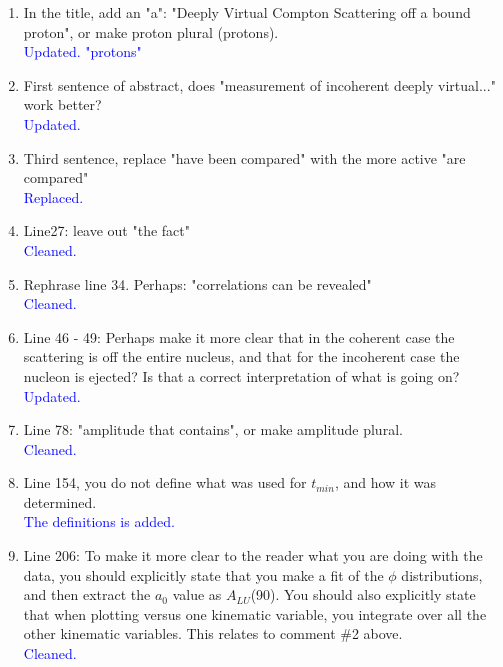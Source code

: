 \documentclass[a4paper,11pt,twoside]{article}
\begin{document}
\begin{enumerate}
  
\item    In the title, add an "a":  "Deeply Virtual Compton Scattering off a bound proton", or make proton plural (protons).\\
   \textcolor{blue}{Updated. "protons"}

\item    First sentence of abstract, does "measurement of incoherent deeply 
   virtual..." work better?\\
   \textcolor{blue}{Updated. }

\item    Third sentence, replace "have been compared" with the more active "are compared"\\
   \textcolor{blue}{Replaced. }

\item    Line27: leave out "the fact"\\
   \textcolor{blue}{Cleaned. }

\item    Rephrase line 34. Perhaps:  "correlations can be revealed"\\
   \textcolor{blue}{Cleaned. }

\item    Line 46 - 49: Perhaps make it more clear that in the coherent case the scattering is off the entire nucleus, and that for the incoherent case the nucleon is ejected? Is that a correct interpretation of what is going on?\\
   \textcolor{blue}{Updated.}

\item    Line 78: "amplitude that contains", or make amplitude plural.\\
   \textcolor{blue}{Cleaned.}

\item    Line 154, you do not define what was used for $t_{min}$, and how it 
   was determined.\\
   \textcolor{blue}{The definitions is added.}

\item    Line 206: To make it more clear to the reader what you are doing with 
   the data, you should explicitly state that you make a fit of the $\phi$ 
      distributions, and then extract the $a_0$ value as $A_{LU}$(90). You 
      should also explicitly state that when plotting versus one kinematic 
      variable, you integrate over all the other kinematic variables. This 
      relates to comment \#2 above.\\
      \textcolor{blue}{Cleaned. }


\end{enumerate}
\end{document}
